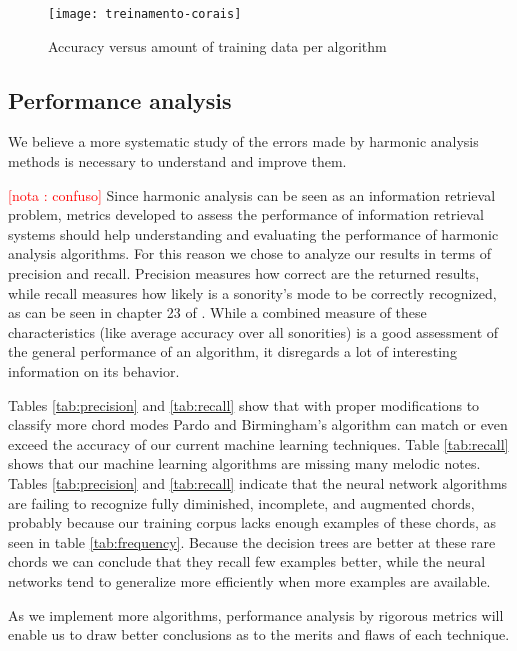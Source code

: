 \documentclass{article}
\newcounter{notacounter}
\newcommand{\nota}[1]{
  \addtocounter{notacounter}{1}
  \textcolor{red}{[nota \arabic{notacounter}: #1]}
}
\begin{document}
\begin{figure}
  \texttt{[image: treinamento-corais]}
  \caption{Accuracy versus amount of training data per algorithm}
  \label{fig:treinamento-corais}
\end{figure}


\subsection{Performance analysis}
\label{sec:common-errors}

We believe a more systematic study of the errors made by harmonic
analysis methods is necessary to understand and improve them.
\nota{confuso} Since harmonic analysis can be seen as an information
retrieval problem, metrics developed to assess the performance of
information retrieval systems should help understanding and evaluating
the performance of harmonic analysis algorithms. For this reason we
chose to analyze our results in terms of precision and recall.
Precision measures how correct are the returned results, while recall
measures how likely is a sonority's mode to be correctly recognized,
as can be seen in chapter 23 of \cite{russell.ea:artificial}. While a
combined measure of these characteristics (like average accuracy over
all sonorities) is a good assessment of the general performance of an
algorithm, it disregards a lot of interesting information on its
behavior.

Tables \ref{tab:precision} and \ref{tab:recall} show that with proper
modifications to classify more chord modes Pardo and Birmingham's
algorithm can match or even exceed the accuracy of our current machine
learning techniques. Table \ref{tab:recall} shows that our machine
learning algorithms are missing many melodic notes. Tables
\ref{tab:precision} and \ref{tab:recall} indicate that the neural
network algorithms are failing to recognize fully diminished,
incomplete, and augmented chords, probably because our training corpus
lacks enough examples of these chords, as seen in table
\ref{tab:frequency}. Because the decision trees are better at these
rare chords we can conclude that they recall few examples better,
while the neural networks tend to generalize more efficiently when
more examples are available.

As we implement more algorithms, performance analysis by rigorous
metrics will enable us to draw better conclusions as to the merits and
flaws of each technique.
\end{document}
